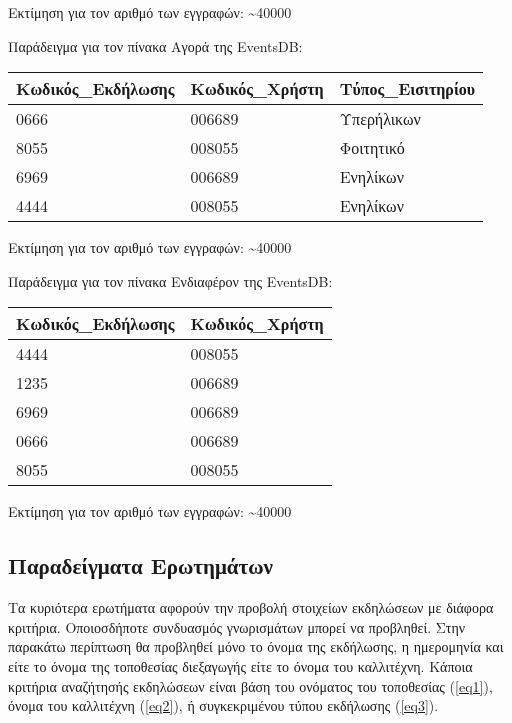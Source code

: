 Εκτίμηση για τον αριθμό των εγγραφών: \textasciitilde 40000

Παράδειγμα για τον πίνακα Αγορά της EventsDB:

\begin{table}[H]
  \centering
  \footnotesize
  \begin{tabular}{|l|l|l|}
  \hline
  Κωδικός\_Εκδήλωσης & Κωδικός\_Χρήστη & Τύπος\_Εισιτηρίου \\ \hline
  0666 & 006689 & Υπερήλικων \\ \hline
  8055 & 008055 & Φοιτητικό \\ \hline
  6969 & 006689 & Ενηλίκων \\ \hline
  4444 & 008055 & Ενηλίκων \\ \hline
  
\end{tabular}
\end{table}
  
Εκτίμηση για τον αριθμό των εγγραφών: \textasciitilde 40000

Παράδειγμα για τον πίνακα Ενδιαφέρον της EventsDB:

\begin{table}[H]
  \centering
  \footnotesize
  \begin{tabular}{|l|l|}
  \hline
  Κωδικός\_Εκδήλωσης & Κωδικός\_Χρήστη \\ \hline
  4444 & 008055 \\ \hline
  1235 & 006689 \\ \hline
  6969 & 006689 \\ \hline
  0666 & 006689 \\ \hline
  8055 & 008055 \\ \hline
\end{tabular}
\end{table}
  
Εκτίμηση για τον αριθμό των εγγραφών: \textasciitilde 40000

\subsection{Παραδείγματα Ερωτημάτων}

Τα κυριότερα ερωτήματα αφορούν την προβολή στοιχείων εκδηλώσεων με
διάφορα κριτήρια. Οποιοσδήποτε συνδυασμός γνωρισμάτων μπορεί να
προβληθεί. Στην παρακάτω περίπτωση θα προβληθεί μόνο το όνομα της
εκδήλωσης, η ημερομηνία και είτε το όνομα της τοποθεσίας διεξαγωγής
είτε το όνομα του καλλιτέχνη.  Κάποια κριτήρια αναζήτησής εκδηλώσεων
είναι βάση του ονόματος του τοποθεσίας (\ref{eq1}), όνομα του
καλλιτέχνη (\ref{eq2}), ή συγκεκριμένου τύπου εκδήλωσης (\ref{eq3}).

